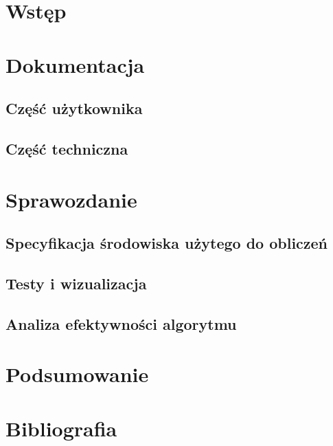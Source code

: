 \documentclass[11pt,a4paper]{article}
\begin{document}
\section{Wstęp}

\section{Dokumentacja}

\subsection{Część użytkownika}

\subsection{Część techniczna}

\section{Sprawozdanie}

\subsection{Specyfikacja środowiska użytego do obliczeń}

\subsection{Testy i wizualizacja}

\subsection{Analiza efektywności algorytmu}

\section{Podsumowanie}

\section{Bibliografia}
\end{document}
